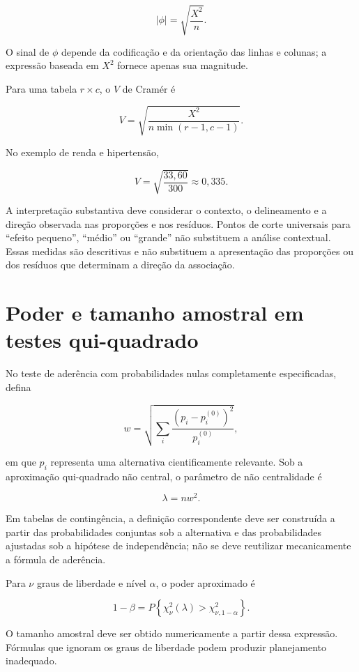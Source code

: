 \documentclass[
  letterpaper,
  DIV=11,
  numbers=noendperiod]{scrreprt}
\begin{document}
\[|\phi|
=\sqrt{\frac{X^2}{n}}.\]

O sinal de \(\phi\) depende da codificação e da orientação das linhas e
colunas; a expressão baseada em \(X^2\) fornece apenas sua magnitude.

Para uma tabela \(r\times c\), o \(V\) de Cramér é

\[V
=\sqrt{
\frac{X^2}
{n\min(r-1,c-1)}
}.\]

No exemplo de renda e hipertensão,

\[V
=\sqrt{\frac{33{,}60}{300}}
\approx0{,}335.\]

A interpretação substantiva deve considerar o contexto, o delineamento e
a direção observada nas proporções e nos resíduos. Pontos de corte
universais para ``efeito pequeno'', ``médio'' ou ``grande'' não
substituem a análise contextual. Essas medidas são descritivas e não
substituem a apresentação das proporções ou dos resíduos que determinam
a direção da associação.

\section{Poder e tamanho amostral em testes
qui-quadrado}\label{poder-e-tamanho-amostral-em-testes-qui-quadrado}

No teste de aderência com probabilidades nulas completamente
especificadas, defina

\[w
=
\sqrt{
\sum_i
\frac{(p_i-p_i^{(0)})^2}{p_i^{(0)}}
},\]

em que \(p_i\) representa uma alternativa cientificamente relevante. Sob
a aproximação qui-quadrado não central, o parâmetro de não centralidade
é

\[\lambda=nw^2.\]

Em tabelas de contingência, a definição correspondente deve ser
construída a partir das probabilidades conjuntas sob a alternativa e das
probabilidades ajustadas sob a hipótese de independência; não se deve
reutilizar mecanicamente a fórmula de aderência.

Para \(\nu\) graus de liberdade e nível \(\alpha\), o poder aproximado é

\[1-\beta
=
P\left
\{
\chi^2_\nu(\lambda)
>
\chi^2_{\nu,1-\alpha}
\right\}.\]

O tamanho amostral deve ser obtido numericamente a partir dessa
expressão. Fórmulas que ignoram os graus de liberdade podem produzir
planejamento inadequado.
\end{document}
